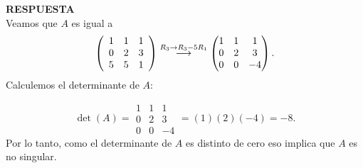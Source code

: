 \documentclass[11pt,letterpaper]{article}
\newcommand{\res}{\textbf{RESPUESTA}\\}
\newcommand{\grstep}[2][\relax]{%
   \ensuremath{\mathrel{
       {\mathop{\longrightarrow}\limits^{#2\mathstrut}_{
                                     \begin{subarray}{l} #1 \end{subarray}}}}}}
\begin{document}
\begin{enumerate}
\res
Veamos que $A$ es igual a 
\begin{equation*}
\left(\begin{array}{rrr}
 1 & 1 & 1\\
 0 & 2 & 3\\
 5 & 5 & 1
\end{array}\right) %
\grstep[]{R_3 \rightarrow R_3-5R_1}
%
\begin{pmatrix}
 1 & 1 & 1\\
 0 & 2 & 3\\
 0 & 0 & -4
\end{pmatrix}.
\end{equation*}
Calculemos el determinante de $A$:

$$ \det(A)=\begin{array}{|rrr|}
 1 & 1 & 1\\
 0 & 2 & 3\\
 0 & 0 & -4
\end{array}=(1)(2)(-4)=-8.$$
Por lo tanto, como el determinante de $A$ es distinto de cero eso implica que $A$ es no singular. 


\end{enumerate}
\end{document}
